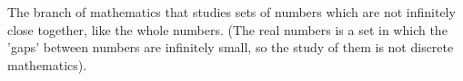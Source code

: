The branch of mathematics that studies sets of numbers which are not infinitely 
close together, like the whole numbers. (The real numbers is a set in which the 
'gaps' between numbers are infinitely small, so the study of them is not discrete
mathematics).
